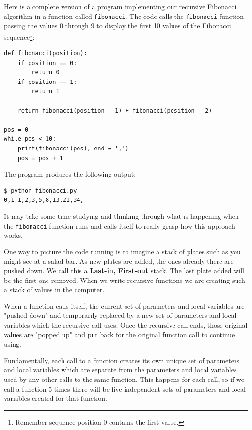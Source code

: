 \pagebreak

Here is a complete version of a program implementing our recursive Fibonacci algorithm in a function called \texttt{fibonacci}. The code calls the \texttt{fibonacci} function passing the values 0 through 9 to display the first 10 values of the Fibonacci sequence\footnote{Remember sequence position 0 contains the first value.}:

\beforeverb
\begin{verbatim}
def fibonacci(position):
    if position == 0:
        return 0
    if position == 1:
        return 1

    return fibonacci(position - 1) + fibonacci(position - 2)

pos = 0
while pos < 10:
    print(fibonacci(pos), end = ',')
    pos = pos + 1
\end{verbatim}
\afterverb

The program produces the following output:

\beforeverb
\begin{verbatim}
$ python fibonacci.py 
0,1,1,2,3,5,8,13,21,34,
\end{verbatim}
\afterverb

It may take some time studying and thinking through what is happening when the \texttt{fibonacci} function runs and calls itself to really grasp how this approach works.

One way to picture the code running is to imagine a stack of plates such as you might see at a salad bar. As new plates are added, the ones already there are pushed down. We call this a \textbf{Last-in, First-out} stack. The last plate added will be the first one removed. When we write recursive functions we are creating such a stack of values in the computer.


When a function calls itself, the current set of parameters and local variables are "pushed down" and temporarily replaced by a new set of parameters and local variables which the recursive call uses. Once the recursive call ends, those original values are "popped up" and put back for the original function call to continue using.

Fundamentally, each call to a function creates its own unique set of parameters and local variables which are separate from the parameters and local variables used by any other calls to the same function. This happens for each call, so if we call a function 5 times there will be five independent sets of parameters and local variables created for that function.

